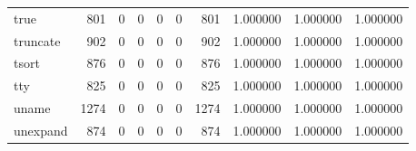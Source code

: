 \begin{longtable}{lrrrrrrrrr}
true      &                                 801 &                                               0 &                                              0 &                                             0 &                                              0 &                                          801 &                                           1.000000 &                               1.000000 &                             1.000000 \\
truncate  &                                 902 &                                               0 &                                              0 &                                             0 &                                              0 &                                          902 &                                           1.000000 &                               1.000000 &                             1.000000 \\
tsort     &                                 876 &                                               0 &                                              0 &                                             0 &                                              0 &                                          876 &                                           1.000000 &                               1.000000 &                             1.000000 \\
tty       &                                 825 &                                               0 &                                              0 &                                             0 &                                              0 &                                          825 &                                           1.000000 &                               1.000000 &                             1.000000 \\
uname     &                                1274 &                                               0 &                                              0 &                                             0 &                                              0 &                                         1274 &                                           1.000000 &                               1.000000 &                             1.000000 \\
unexpand  &                                 874 &                                               0 &                                              0 &                                             0 &                                              0 &                                          874 &                                           1.000000 &                               1.000000 &                             1.000000 \\

\end{longtable}
